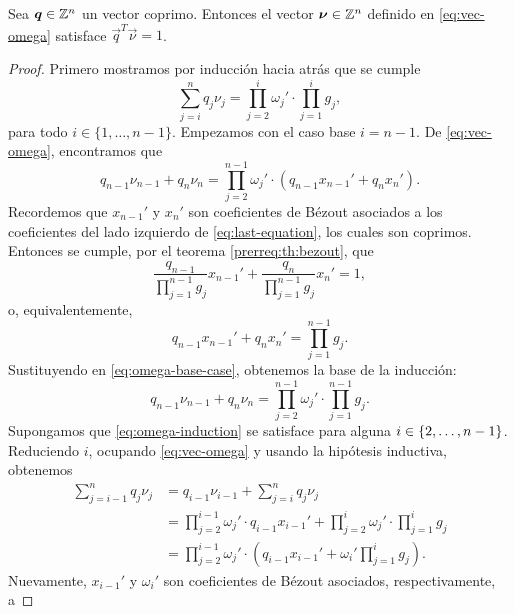 \begin{lemma} \label{lemma:iso1}
	Sea $\boldsymbol{q} \in \mathbb{Z}^{n}$ un vector coprimo. Entonces el vector $\boldsymbol{\nu}
	\in \mathbb{Z}^n$ definido en \eqref{eq:vec-omega} satisface $\vec{q}^T\vec{\nu} =
	1$.
\end{lemma}
\begin{proof}
	Primero mostramos por inducción hacia atrás que se cumple
	\begin{equation}
		\label{eq:omega-induction} \sum_{j=i}^{n}q_j\nu_j =
		\prod_{j=2}^{i}\omega_j' \cdot \prod_{j=1}^{i}g_j,
	\end{equation}
	para todo $i \in \lbrace 1, \ldots, n - 1\rbrace$. Empezamos con el caso base $i = n - 1$. De
	\eqref{eq:vec-omega}, encontramos que
	\begin{equation}
		\label{eq:omega-base-case}
		q_{n-1}\nu_{n-1} + q_n\nu_n =
		\prod_{j=2}^{n-1}\omega_j' \cdot \left(q_{n-1}x_{n-1}' + q_nx_n'\right).
	\end{equation}
	Recordemos que $x_{n-1}'$ y $x_n'$ son coeficientes de Bézout asociados a los coeficientes del
	lado izquierdo de \eqref{eq:last-equation}, los cuales son coprimos. Entonces se cumple, por el
	teorema \ref{prerreq:th:bezout}, que
	\begin{equation*}
		\frac{q_{n-1}}{\prod_{j=1}^{n-1}g_j}x_{n-1}' +
		\frac{q_n}{\prod_{j=1}^{n-1}g_j}x_n' = 1,
	\end{equation*}
	o, equivalentemente,
	\begin{equation*}
		q_{n-1}x_{n-1}' + q_nx_n' = \prod_{j=1}^{n-1}g_j.
	\end{equation*}
	Sustituyendo en \eqref{eq:omega-base-case}, obtenemos la base de la inducción:
	\begin{equation*}
		q_{n-1}\nu_{n-1} + q_n\nu_n  =
		\prod_{j=2}^{n-1}\omega_j' \cdot \prod_{j=1}^{n-1}g_j.
	\end{equation*}
	Supongamos que \eqref{eq:omega-induction} se satisface para alguna $i \in \lbrace 2, \ldots, n -
	1 \rbrace$. Reduciendo $i$, ocupando \eqref{eq:vec-omega} y usando la hipótesis inductiva,
	obtenemos
	\begin{align*}
		\sum_{j=i-1}^{n}q_j\nu_j
		&= q_{i-1}\nu_{i-1} + \sum_{j=i}^{n}q_j\nu_j \\
		&= \prod_{j=2}^{i-1}\omega_j' \cdot q_{i-1}x_{i-1}' + \prod_{j=2}^{i}\omega_j' \cdot
		\prod_{j=1}^{i}g_j \\
		&= \prod_{j=2}^{i-1}\omega_j' \cdot \left( q_{i-1}x_{i-1}' + \omega_i'
			\prod_{j=1}^{i}g_j \right).
	\end{align*}
	Nuevamente, $x_{i-1}'$ y $\omega_i'$ son coeficientes de Bézout asociados, respectivamente, a

\end{proof}
